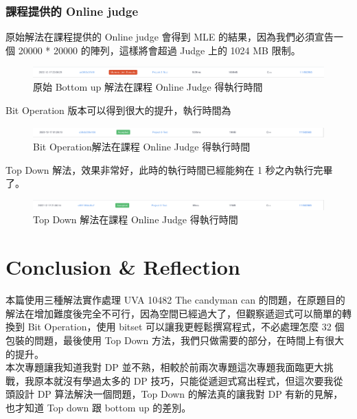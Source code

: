 \documentclass[12pt]{article}
\begin{document}
	\section{課程提供的 Online judge}
	
	原始解法在課程提供的 Online judge 會得到 MLE 的結果，因為我們必須宣告一個 20000 * 20000 的陣列，這樣將會超過 Judge 上的 1024 MB 限制。\\
	
	\begin{figure}[hbp]
		\centering
		\includegraphics[width=1.1\textwidth]{BottomUp_judge}
		\caption{原始 Bottom up 解法在課程 Online Judge 得執行時間}
		\label{Fig.classOJ1}
	\end{figure}
	
	Bit Operation 版本可以得到很大的提升，執行時間為
	\begin{figure}[hbp]
		\centering
		\includegraphics[width=1.1\textwidth]{BitOperation_judge}
		\caption{Bit Operation解法在課程 Online Judge 得執行時間}
		\label{Fig.classOJ2}
	\end{figure}

	Top Down 解法，效果非常好，此時的執行時間已經能夠在 1 秒之內執行完畢了。
	\begin{figure}[hbp]
		\centering
		\includegraphics[width=1.1\textwidth]{TopDown_judge}
		\caption{Top Down 解法在課程 Online Judge 得執行時間}
		\label{Fig.classOJ3}
	\end{figure}


	\part{Conclusion \& Reflection}
	
	本篇使用三種解法實作處理 UVA 10482 The candyman can 的問題，在原題目的解法在增加難度後完全不可行，因為空間已經過大了，但觀察遞迴式可以簡單的轉換到 Bit Operation，使用 bitset 可以讓我更輕鬆撰寫程式，不必處理怎麼 32 個包裝的問題，最後使用 Top Down 方法，我們只做需要的部分，在時間上有很大的提升。\\
	
	本次專題讓我知道我對 DP 並不熟，相較於前兩次專題這次專題我面臨更大挑戰，我原本就沒有學過太多的 DP 技巧，只能從遞迴式寫出程式，但這次要我從頭設計 DP 算法解決一個問題，Top Down 的解法真的讓我對 DP 有新的見解，也才知道 Top down 跟 bottom up 的差別。
\end{document}
